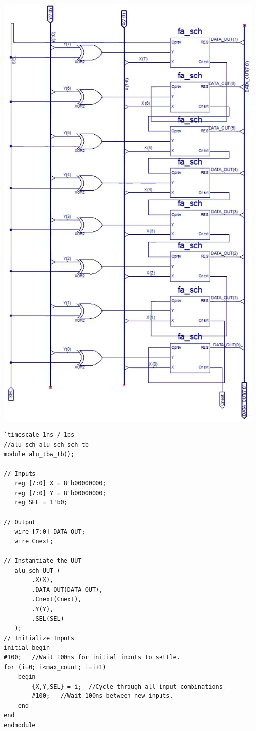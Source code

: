 \documentclass[12pt]{article}
\begin{document}
		\begin{center}
			\includegraphics[scale=.5]{alu_sch.png}
		\end{center}
		
		\begin{Verbatim}[frame=single, fontsize= \small]
`timescale 1ns / 1ps
//alu_sch_alu_sch_sch_tb
module alu_tbw_tb();

// Inputs
   reg [7:0] X = 8'b00000000;
   reg [7:0] Y = 8'b00000000;
   reg SEL = 1'b0;

// Output
   wire [7:0] DATA_OUT;
   wire Cnext;

// Instantiate the UUT
   alu_sch UUT (
		.X(X), 
		.DATA_OUT(DATA_OUT), 
		.Cnext(Cnext), 
		.Y(Y), 
		.SEL(SEL)
   );
// Initialize Inputs
initial begin     
#100;   //Wait 100ns for initial inputs to settle.      
for (i=0; i<max_count; i=i+1)           
	begin             
		{X,Y,SEL} = i;  //Cycle through all input combinations.             
		#100;   //Wait 100ns between new inputs.         
	end 
end 
endmodule
			
		\end{Verbatim}
\end{document}
